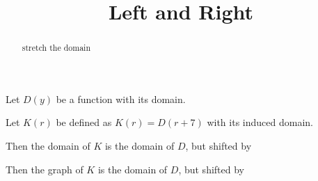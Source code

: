 \documentclass{ximera}
\title{Left and Right}
\begin{document}
\begin{abstract}
stretch the domain
\end{abstract}
\maketitle









Let $D(y)$ be a function with its domain.

Let $K(r)$ be defined as $K(r) = D(r+7)$ with its induced domain.


Then the domain of $K$ is the domain of $D$, but shifted  by 


Then the graph of $K$ is the domain of $D$, but shifted  by 
\end{document}
